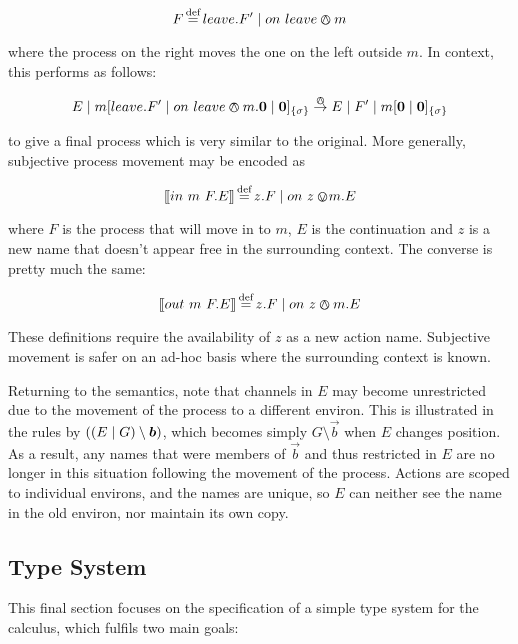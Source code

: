 \documentclass[orivec]{llncs}
\begin{document}
\begin{equation}
F \operatorname{\stackrel{\textrm{def}}{=}} leave.F^\prime \mid on\ leave \varowedge m
\end{equation}

\noindent where the process on the right moves the one on the left
outside $m$.  In context, this performs as follows:

\begin{equation}
E \mid {m}[ leave.F^\prime \mid on\ leave \varowedge m.\textbf{0} \mid
 \textbf{0} ]_{\{\sigma\}} 
\stackrel{\varowedge}{\rightarrow}
E \mid F^\prime \mid {m}[ \textbf{0} \mid \textbf{0} ]_{\{\sigma\}}
\end{equation}

\noindent to give a final process which is very similar to the original.
More generally, subjective process movement may be encoded as

\begin{equation}
[\hspace{-0.3ex}[ in\ m\ F.E ]\hspace{-0.3ex}] \operatorname{\stackrel{\textrm{def}}{=}} z.F \mid on\ z \varovee\!m.E
\end{equation}

\noindent where $F$ is the process that will move in to $m$, $E$ is
the continuation and $z$ is a new name that doesn't appear free in the
surrounding context.  The converse is pretty much the same:

\begin{equation}
[\hspace{-0.3ex}[ out\ m\ F.E ]\hspace{-0.3ex}] \operatorname{\stackrel{\textrm{def}}{=}} z.F \mid on\ z \varowedge m.E
\end{equation}

These definitions require the availability of $z$ as a new action name.
Subjective movement is safer on an ad-hoc basis where the surrounding
context is known.

Returning to the semantics, note that channels in $E$ may become
unrestricted due to the movement of the process to a different environ.
This is illustrated in the rules by $((E \pc G) \setminus \vec{b})$,
which becomes simply $G \setminus \vec{b}$ when $E$ changes position.
As a result, any names that were members of $\vec{b}$ and thus
restricted in $E$ are no longer in this situation following the movement
of the process.  Actions are scoped to individual environs, and the
names are unique, so $E$ can neither see the name in the old environ,
nor maintain its own copy.

\subsection{Type System}
\label{typesys}

This final section focuses on the specification of a simple type
system for the calculus, which fulfils two main goals:
\end{document}

